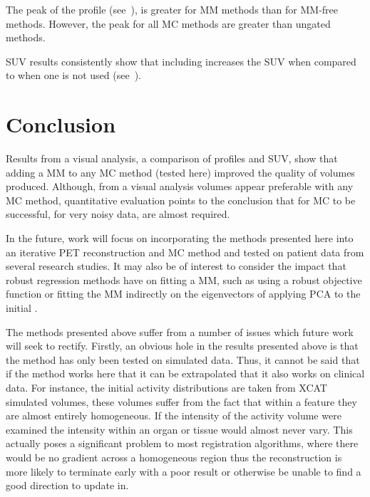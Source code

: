             The peak of the profile (see~), is greater for \gls{MM} methods than for \gls{MM}-free methods. However, the peak for all \gls{MC} methods are greater than ungated methods.
             
            \gls{SUV} results consistently show that including  increases the \gls{SUV} when compared to when one is not used (see~).
        
        \section{Conclusion} \label{sec:comparison_of_motion_correction_methods_incorporating_motion_modelling_for_pet/ct_using_a_single_breath_hold_attenuation_map_conclusions}
            Results from a visual analysis, a comparison of profiles and \gls{SUV}, show that adding a \gls{MM} to any \gls{MC} method (tested here) improved the quality of volumes produced. Although, from a visual analysis volumes appear preferable with any \gls{MC} method, quantitative evaluation points to the conclusion that for \gls{MC} to be successful, for very noisy data,  are almost required.
            
            In the future, work will focus on incorporating the methods presented here into an iterative \gls{PET} reconstruction and \gls{MC} method and tested on patient data from several research studies. It may also be of interest to consider the impact that robust regression methods have on fitting a \gls{MM}, such as using a robust objective function or fitting the \gls{MM} indirectly on the eigenvectors of applying \gls{PCA} to the initial .
    
        The methods presented above suffer from a number of issues which future work will seek to rectify. Firstly, an obvious hole in the results presented above is that the method has only been tested on simulated data. Thus, it cannot be said that if the method works here that it can be extrapolated that it also works on clinical data. For instance, the initial activity distributions are taken from \gls{XCAT} simulated volumes, these volumes suffer from the fact that within a feature they are almost entirely homogeneous. If the intensity of the activity volume were examined the intensity within an organ or tissue would almost never vary. This actually poses a significant problem to most registration algorithms, where there would be no gradient across a homogeneous region thus the reconstruction is more likely to terminate early with a poor result or otherwise be unable to find a good direction to update in.
        
